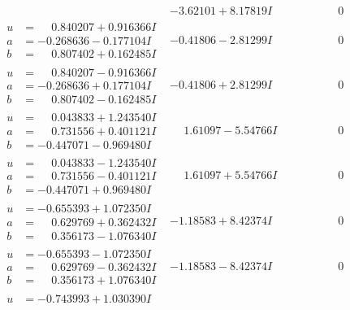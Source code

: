 \documentclass[1p]{elsarticle_modified}
\theoremstyle{definition}
\begin{document}
$$\begin{array}{c|c|c}
 & -3.62101 + 8.17819 I & \phantom{-0.000000 } 0 \\ \hline\begin{aligned}
u &= \phantom{-}0.840207 + 0.916366 I \\
a &= -0.268636 - 0.177104 I \\
b &= \phantom{-}0.807402 + 0.162485 I\end{aligned}
 & -0.41806 - 2.81299 I & \phantom{-0.000000 } 0 \\ \hline\begin{aligned}
u &= \phantom{-}0.840207 - 0.916366 I \\
a &= -0.268636 + 0.177104 I \\
b &= \phantom{-}0.807402 - 0.162485 I\end{aligned}
 & -0.41806 + 2.81299 I & \phantom{-0.000000 } 0 \\ \hline\begin{aligned}
u &= \phantom{-}0.043833 + 1.243540 I \\
a &= \phantom{-}0.731556 + 0.401121 I \\
b &= -0.447071 - 0.969480 I\end{aligned}
 & \phantom{-}1.61097 - 5.54766 I & \phantom{-0.000000 } 0 \\ \hline\begin{aligned}
u &= \phantom{-}0.043833 - 1.243540 I \\
a &= \phantom{-}0.731556 - 0.401121 I \\
b &= -0.447071 + 0.969480 I\end{aligned}
 & \phantom{-}1.61097 + 5.54766 I & \phantom{-0.000000 } 0 \\ \hline\begin{aligned}
u &= -0.655393 + 1.072350 I \\
a &= \phantom{-}0.629769 + 0.362432 I \\
b &= \phantom{-}0.356173 - 1.076340 I\end{aligned}
 & -1.18583 + 8.42374 I & \phantom{-0.000000 } 0 \\ \hline\begin{aligned}
u &= -0.655393 - 1.072350 I \\
a &= \phantom{-}0.629769 - 0.362432 I \\
b &= \phantom{-}0.356173 + 1.076340 I\end{aligned}
 & -1.18583 - 8.42374 I & \phantom{-0.000000 } 0 \\ \hline\begin{aligned}
u &= -0.743993 + 1.030390 I \\

\end{aligned}
\end{array}$$
\end{document}
